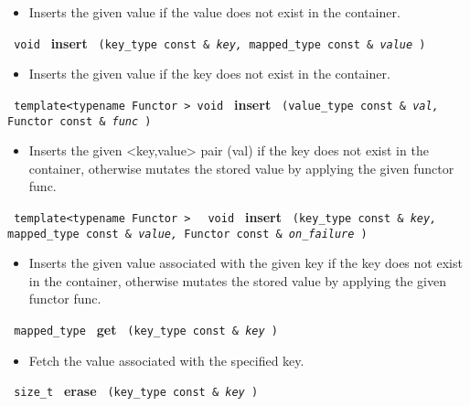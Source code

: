 \begin{itemize}
\item
Inserts the given value if the value does not exist in the container.
\end{itemize}

\noindent
\texttt{%
void
}
\newline
\textbf{insert}%
\texttt{%
(key\_type const \&
\textit{key,}%
mapped\_type const \&
\textit{value}%
)
}

\begin{itemize}
\item
Inserts the given value if the key does not exist in the container.
\end{itemize}

\noindent
\texttt{%
template<typename Functor >
void
}
\newline
\textbf{insert}%
\texttt{%
(value\_type const \&
\textit{val,}%
Functor const \&
\textit{func}%
)
}

\begin{itemize}
\item
Inserts the given <key,value> pair (val) if the key does not exist in the container, otherwise mutates the stored value by applying the given functor func.
\end{itemize}

\noindent
\texttt{%
template<typename Functor >
}
\texttt{%
void
}
\newline
\textbf{insert}%
\texttt{%
(key\_type const \&
\textit{key,}%
mapped\_type const \&
\textit{value,}%
Functor const \&
\textit{on\_failure}%
)
}

\begin{itemize}
\item
Inserts the given value associated with the given key if the key does not exist in the container, otherwise mutates the stored value by applying the given functor func.
\end{itemize}

\noindent
\texttt{%
mapped\_type
}
\newline
\textbf{get}%
\texttt{%
(key\_type const \&
\textit{key}%
)
}

\begin{itemize}
\item
Fetch the value associated with the specified key.
\end{itemize}

\noindent
\texttt{%
size\_t
}
\newline
\textbf{erase}%
\texttt{%
(key\_type const \&
\textit{key}%
)
}

